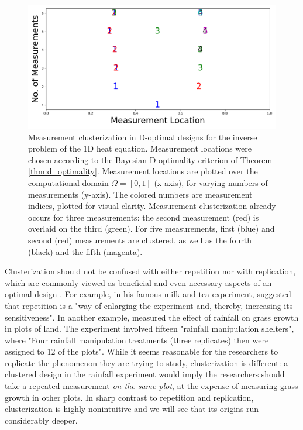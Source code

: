 \begin{figure}
    \centering
    \includegraphics[height=0.5\textwidth]{figs/dst_modelError0.png}
    \caption{Measurement clusterization in D-optimal designs for the
      inverse problem of the 1D heat equation. Measurement locations
      were chosen according to the Bayesian D-optimality criterion of
      Theorem \ref{thm:d_optimality}. Measurement locations are
      plotted over the computational domain \(\Omega = [0, 1]\)
      (x-axis), for varying numbers of measurements (y-axis). The
      colored numbers are measurement indices, plotted for visual
      clarity. Measurement clusterization already occurs for three
      measurements: the second measurement (red) is overlaid on the
      third (green). For five measurements, first (blue) and second
      (red) measurements are clustered, as well as the fourth (black)
      and the fifth (magenta).}
  \label{fig:clusterization_illustration}
\end{figure}


Clusterization should not be confused with either repetition nor with
replication, which are commonly viewed as beneficial and even
necessary aspects of an optimal design \cite{fisher1949design,
  morris2011, schafer2001replication}. For example,
\cite{fisher1949design} in his famous milk and tea experiment,
suggested that repetition is a "way of enlarging the experiment and,
thereby, increasing its sensitiveness". In another example,
\cite{fay2000rainfall} measured the effect of rainfall on grass growth
in plots of land. The experiment involved fifteen "rainfall
manipulation shelters", where "Four rainfall manipulation treatments
(three replicates) then were assigned to 12 of the plots". While it
seems reasonable for the researchers to replicate the phenomenon they
are trying to study, clusterization is different: a clustered design
in the rainfall experiment would imply the researchers should take a
repeated measurement \emph{on the same plot}, at the expense of
measuring grass growth in other plots. In sharp contrast to repetition
and replication, clusterization is highly nonintuitive and we will see
that its origins run considerably deeper.


